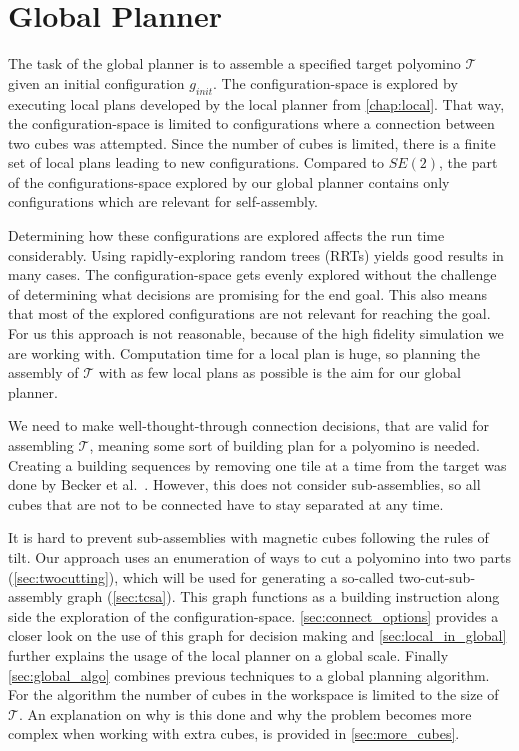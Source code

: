 \chapter{Global Planner}
\label{chap:global}

The task of the global planner is to assemble a specified target polyomino $\mathcal{T}$ given an initial configuration $g_\textit{init}$.
The configuration-space is explored by executing local plans developed by the local planner from \autoref{chap:local}.
That way, the configuration-space is limited to configurations where a connection between two cubes was attempted.
Since the number of cubes is limited, there is a finite set of local plans leading to new configurations.
Compared to $\textit{SE}(2)$, the part of the configurations-space explored by our global planner contains only configurations which are relevant for self-assembly.

Determining how these configurations are explored affects the run time considerably.
Using rapidly-exploring random trees (RRTs) \cite{lavalle1998} yields good results in many cases.
The configuration-space gets evenly explored without the challenge of determining what decisions are promising for the end goal.
This also means that most of the explored configurations are not relevant for reaching the goal.
For us this approach is not reasonable, because of the high fidelity simulation we are working with.
Computation time for a local plan is huge, so planning the assembly of $\mathcal{T}$ with as few local plans as possible is the aim for our global planner.

We need to make well-thought-through connection decisions, that are valid for assembling $\mathcal{T}$, meaning some sort of building plan for a polyomino is needed.
Creating a building sequences by removing one tile at a time from the target was done by Becker et al.\ \cite{Becker2020}.
However, this does not consider sub-assemblies, so all cubes that are not to be connected have to stay separated at any time.

It is hard to prevent sub-assemblies with magnetic cubes following the rules of tilt.
Our approach uses an enumeration of ways to cut a polyomino into two parts (\autoref{sec:twocutting}), which will be used for generating a so-called two-cut-sub-assembly graph (\autoref{sec:tcsa}).
This graph functions as a building instruction along side the exploration of the configuration-space.
\autoref{sec:connect_options} provides a closer look on the use of this graph for decision making and \autoref{sec:local_in_global} further explains the usage of the local planner on a global scale. 
Finally \autoref{sec:global_algo} combines previous techniques to a global planning algorithm.
For the algorithm the number of cubes in the workspace is limited to the size of $\mathcal{T}$.
An explanation on why is this done and why the problem becomes more complex when working with extra cubes, is provided in \autoref{sec:more_cubes}.


